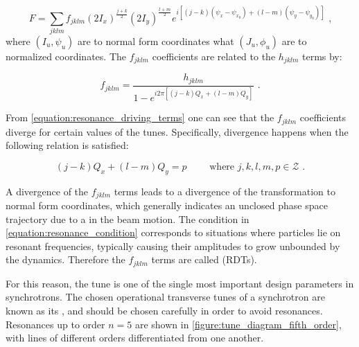 \begin{equation}
    F = \sum_{jklm} f_{jklm} \left( 2 I_x \right)^{\frac{j+k}{2}} \left(2 I_y \right)^{\frac{l+m}{2}} e^{i \left[ (j-k) \left( \psi_x - \psi_{x_0} \right) + (l-m) \left( \psi_y - \psi_{y_0} \right) \right]} \text{ ,}
    \label{equation:generating_function_expansion}
\end{equation}
where \((I_u, \psi_u)\) are to normal form coordinates what \((J_u, \phi_u)\) are to normalized coordinates.
The \(f_{jklm}\) coefficients are related to the \(h_{jklm}\) terms by:

\begin{equation}
    f_{jklm} = \frac{h_{jklm}}{1 - e^{i 2 \pi \left[ \left(j-k\right) Q_x + \left(l-m\right) Q_y \right]}} \text{ .}
    \label{equation:resonance_driving_terms}
\end{equation}

From \cref{equation:resonance_driving_terms} one can see that the \(f_{jklm}\) coefficients diverge for certain values of the tunes.
Specifically, divergence happens when the following relation is satisfied:

\begin{equation}
    \left(j-k\right) Q_x + \left(l-m\right) Q_y = p \quad \quad \text { where } j, k, l, m, p \in \mathcal{Z} \text{ .}
    \label{equation:resonance_condition}
\end{equation}

A divergence of the \(f_{jklm}\) terms leads to a divergence of the transformation to normal form coordinates, which generally indicates an unclosed phase space trajectory due to a  in the beam motion.
The condition in \cref{equation:resonance_condition} corresponds to situations where particles lie on resonant frequencies, typically causing their amplitudes to grow unbounded by the dynamics.
Therefore the \(f_{jklm}\) terms are called  (RDTs).

For this reason, the tune is one of the single most important design parameters in synchrotrons.
The chosen operational transverse tunes of a synchrotron are known as its , and should be chosen carefully in order to avoid resonances.
Resonances up to order \(n = 5\) are shown in \cref{figure:tune_diagram_fifth_order}, with lines of different orders differentiated from one another.

